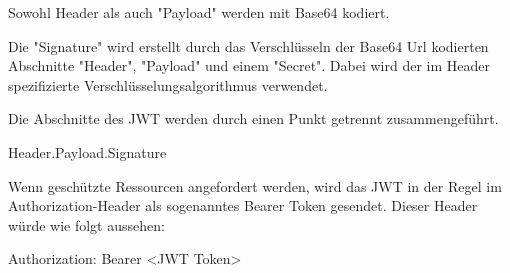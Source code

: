 Sowohl Header als auch "Payload" werden mit Base64 kodiert.

Die "Signature" wird erstellt durch das Verschlüsseln der Base64 Url kodierten Abschnitte "Header", "Payload" und einem "Secret". 
Dabei wird der im Header spezifizierte Verschlüsselungsalgorithmus verwendet.\cite{RFC7519}\cite{WdsJWT}

Die Abschnitte des JWT werden durch einen Punkt getrennt zusammengeführt. 

{\ttfamily Header.Payload.Signature}

Wenn geschützte Ressourcen angefordert werden, wird das JWT in der Regel im Authorization-Header als sogenanntes Bearer Token gesendet. Dieser Header würde wie folgt aussehen\cite{Auth0JWT}:

{\ttfamily Authorization: Bearer \textless JWT Token\textgreater}


